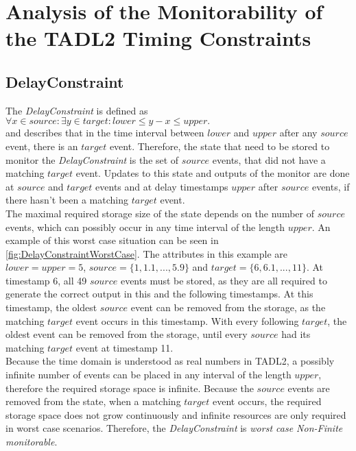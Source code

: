 \chapter{Analysis of the Monitorability of the TADL2 Timing Constraints}
\label{chapter-TADL2}

\section{DelayConstraint}
	\label{monitorability_DelayConstraint}
	The \emph{DelayConstraint} is defined as\\[10pt]
	\begin{math}
		\forall x\in source:\exists y\in target: lower\leq y-x\leq upper.
	\end{math}\\[10pt]
	and describes that in the time interval between $lower$ and $upper$ after any $source$ event, there is an $target$ event. Therefore, the state that need to be stored to monitor the \emph{DelayConstraint} is the set of $source$ events, that did not have a matching $target$ event. Updates to this state and outputs of the monitor are done at $source$ and $target$ events and at delay timestamps $upper$ after $source$ events, if there hasn't been a matching $target$ event.\\
	The maximal required storage size of the state depends on the number of $source$ events, which can possibly occur in any time interval of the length $upper$. An example of this worst case situation can be seen in \ref{fig:DelayConstraintWorstCase}. The attributes in this example are $lower=upper=5$, $source=\{1, 1.1, ..., 5.9\}$ and $target=\{6, 6.1, ..., 11\}$. At timestamp 6, all 49 $source$ events must be stored, as they are all required to generate the correct output in this and the following timestamps. At this timestamp, the oldest $source$ event can be removed from the storage, as the matching $target$ event occurs in this timestamp. With every following $target$, the oldest event can be removed from the storage, until every $source$ had its matching $target$ event at timestamp 11.\\
	Because the time domain is understood as real numbers in TADL2, a possibly infinite number of events can be placed in any interval of the length $upper$, therefore the required storage space is infinite. Because the $source$ events are removed from the state, when a matching $target$ event occurs, the required storage space does not grow continuously and infinite resources are only required in worst case scenarios. Therefore, the \emph{DelayConstraint} is \emph{worst case Non-Finite monitorable}.
